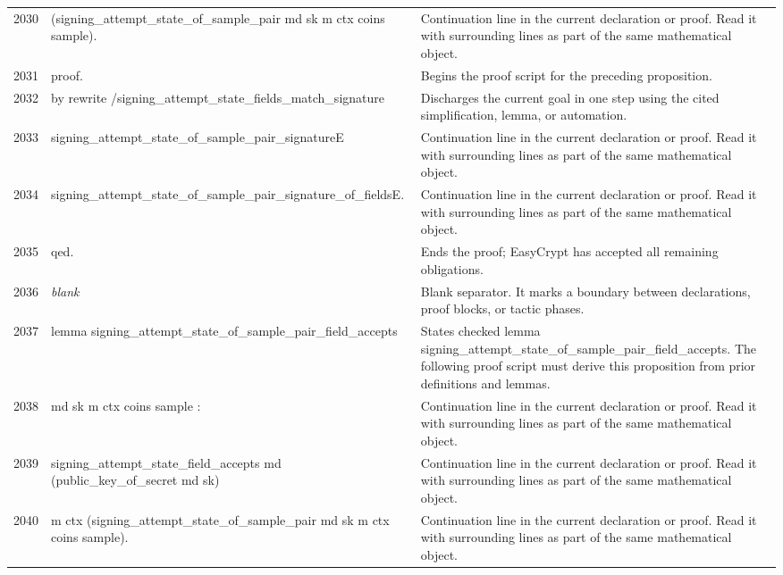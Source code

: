 \documentclass[10pt]{article}
\begin{document}
\begin{longtable}{r L{0.53\textwidth} L{0.37\textwidth}}
2030 & {\ttfamily\scriptsize     (signing\_attempt\_state\_of\_sample\_pair md sk m ctx coins sample).} & Continuation line in the current declaration or proof.  Read it with surrounding lines as part of the same mathematical object. \\
2031 & {\ttfamily\scriptsize proof.} & Begins the proof script for the preceding proposition. \\
2032 & {\ttfamily\scriptsize by rewrite /signing\_attempt\_state\_fields\_match\_signature} & Discharges the current goal in one step using the cited simplification, lemma, or automation. \\
2033 & {\ttfamily\scriptsize            signing\_attempt\_state\_of\_sample\_pair\_signatureE} & Continuation line in the current declaration or proof.  Read it with surrounding lines as part of the same mathematical object. \\
2034 & {\ttfamily\scriptsize            signing\_attempt\_state\_of\_sample\_pair\_signature\_of\_fieldsE.} & Continuation line in the current declaration or proof.  Read it with surrounding lines as part of the same mathematical object. \\
2035 & {\ttfamily\scriptsize qed.} & Ends the proof; EasyCrypt has accepted all remaining obligations. \\
2036 & {\ttfamily\scriptsize \emph{blank}} & Blank separator.  It marks a boundary between declarations, proof blocks, or tactic phases. \\
2037 & {\ttfamily\scriptsize lemma signing\_attempt\_state\_of\_sample\_pair\_field\_accepts} & States checked lemma signing\_attempt\_state\_of\_sample\_pair\_field\_accepts.  The following proof script must derive this proposition from prior definitions and lemmas. \\
2038 & {\ttfamily\scriptsize    md sk m ctx coins sample :} & Continuation line in the current declaration or proof.  Read it with surrounding lines as part of the same mathematical object. \\
2039 & {\ttfamily\scriptsize   signing\_attempt\_state\_field\_accepts md (public\_key\_of\_secret md sk)} & Continuation line in the current declaration or proof.  Read it with surrounding lines as part of the same mathematical object. \\
2040 & {\ttfamily\scriptsize     m ctx (signing\_attempt\_state\_of\_sample\_pair md sk m ctx coins sample).} & Continuation line in the current declaration or proof.  Read it with surrounding lines as part of the same mathematical object. \\

\end{longtable}
\end{document}

